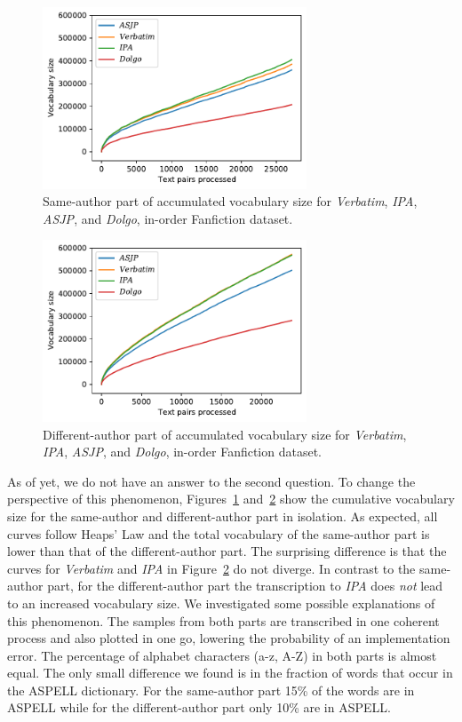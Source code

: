 \begin{figure}
  \centering
  \includegraphics[width=0.7\textwidth]{figures/cum_vocab_size_ff_inorder_onlysame_ipa}
  \caption{Same-author part of accumulated vocabulary size for \textit{Verbatim}, \textit{IPA}, \textit{ASJP}, and \textit{Dolgo}, in-order Fanfiction dataset.}
  \label{fig:cumvocab_same}
\end{figure}
\begin{figure}
  \centering
  \includegraphics[width=0.7\textwidth]{figures/cum_vocab_size_ff_inorder_onlydiff_ipa}
  \caption{Different-author part of accumulated vocabulary size for \textit{Verbatim}, \textit{IPA}, \textit{ASJP}, and \textit{Dolgo}, in-order Fanfiction dataset.}
  \label{fig:cumvocab_diff}
\end{figure}
As of yet, we do not have an answer to the second question.
To change the perspective of this phenomenon, Figures~\ref{fig:cumvocab_same} and~\ref{fig:cumvocab_diff} show the cumulative vocabulary size for the same-author and different-author part in isolation.
As expected, all curves follow Heaps' Law and the total vocabulary of the same-author part is lower than that of the different-author part.
The surprising difference is that the curves for \textit{Verbatim} and \textit{IPA} in Figure~\ref{fig:cumvocab_diff} do not diverge.
In contrast to the same-author part, for the different-author part the transcription to \textit{IPA} does \textit{not} lead to an increased vocabulary size.
We investigated some possible explanations of this phenomenon.
The samples from both parts are transcribed in one coherent process and also plotted in one go, lowering the probability of an implementation error.
The percentage of alphabet characters (a-z, A-Z) in both parts is almost equal.
The only small difference we found is in the fraction of words that occur in the ASPELL dictionary.
For the same-author part 15\% of the words are in ASPELL while for the different-author part only 10\% are in ASPELL\@.

